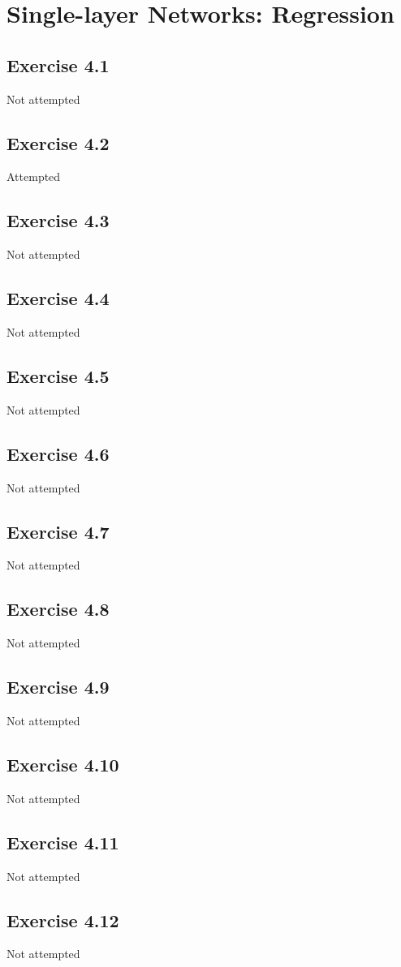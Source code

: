 \section{Single-layer Networks: Regression}

\subsection{Exercise 4.1}
Not attempted

\subsection{Exercise 4.2}
Attempted



\subsection{Exercise 4.3}
Not attempted


\subsection{Exercise 4.4}
Not attempted

\subsection{Exercise 4.5}
Not attempted

\subsection{Exercise 4.6}
Not attempted

\subsection{Exercise 4.7}
Not attempted

\subsection{Exercise 4.8}
Not attempted

\subsection{Exercise 4.9}
Not attempted

\subsection{Exercise 4.10}
Not attempted

\subsection{Exercise 4.11}
Not attempted

\subsection{Exercise 4.12}
Not attempted

